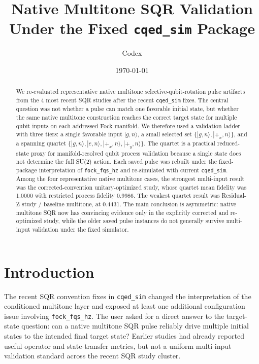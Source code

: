 \documentclass[aps,pra,twocolumn,reprint,amsmath,amssymb]{revtex4-2}
\begin{document}
\title{Native Multitone SQR Validation Under the Fixed \texttt{cqed\_sim} Package}
\author{Codex}
\date{\today}

\begin{abstract}
We re-evaluated representative native multitone selective-qubit-rotation pulse artifacts from the 4 most recent SQR studies after the recent \texttt{cqed\_sim} fixes. The central question was not whether a pulse can match one favorable initial state, but whether the same native multitone construction reaches the correct target state for multiple qubit inputs on each addressed Fock manifold. We therefore used a validation ladder with three tiers: a single favorable input $|g,n\rangle$, a small selected set $\{|g,n\rangle, |+_x,n\rangle\}$, and a spanning quartet $\{|g,n\rangle, |e,n\rangle, |+_x,n\rangle, |+_y,n\rangle\}$. The quartet is a practical reduced-state proxy for manifold-resolved qubit process validation because a single state does not determine the full SU(2) action. Each saved pulse was rebuilt under the fixed-package interpretation of \texttt{fock\_fqs\_hz} and re-simulated with current \texttt{cqed\_sim}. Among the four representative native multitone cases, the strongest multi-input result was the corrected-convention unitary-optimized study, whose quartet mean fidelity was 1.0000 with restricted process fidelity 0.9986. The weakest quartet result was Residual-Z study / baseline multitone, at 0.4431. The main conclusion is asymmetric: native multitone SQR now has convincing evidence only in the explicitly corrected and re-optimized study, while the older saved pulse instances do not generally survive multi-input validation under the fixed simulator.
\end{abstract}

\maketitle

\section{Introduction}
The recent SQR convention fixes in \texttt{cqed\_sim} changed the interpretation of the conditioned multitone layer and exposed at least one additional configuration issue involving \texttt{fock\_fqs\_hz}. The user asked for a direct answer to the target-state question: can a native multitone SQR pulse reliably drive multiple initial states to the intended final target state? Earlier studies had already reported useful operator and state-transfer metrics, but not a uniform multi-input validation standard across the recent SQR study cluster.
\end{document}
